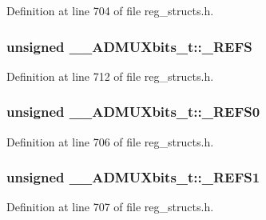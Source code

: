 Definition at line 704 of file reg\+\_\+structs.\+h.

\hypertarget{union_____a_d_m_u_xbits__t_a0b409640eeea6166e1a035446ede13e9}{
\subsubsection[{\+\_\+\+R\+E\+F\+S}]{\setlength{\rightskip}{0pt plus 5cm}unsigned \+\_\+\+\_\+\+A\+D\+M\+U\+Xbits\+\_\+t\+::\+\_\+\+R\+E\+F\+S}}\label{union_____a_d_m_u_xbits__t_a0b409640eeea6166e1a035446ede13e9}


Definition at line 712 of file reg\+\_\+structs.\+h.

\hypertarget{union_____a_d_m_u_xbits__t_acde77705271f7e98bde7bff3c2d28e8a}{
\subsubsection[{\+\_\+\+R\+E\+F\+S0}]{\setlength{\rightskip}{0pt plus 5cm}unsigned \+\_\+\+\_\+\+A\+D\+M\+U\+Xbits\+\_\+t\+::\+\_\+\+R\+E\+F\+S0}}\label{union_____a_d_m_u_xbits__t_acde77705271f7e98bde7bff3c2d28e8a}


Definition at line 706 of file reg\+\_\+structs.\+h.

\hypertarget{union_____a_d_m_u_xbits__t_af3ccbaeb688b8b7848b8b020b8506fc0}{
\subsubsection[{\+\_\+\+R\+E\+F\+S1}]{\setlength{\rightskip}{0pt plus 5cm}unsigned \+\_\+\+\_\+\+A\+D\+M\+U\+Xbits\+\_\+t\+::\+\_\+\+R\+E\+F\+S1}}\label{union_____a_d_m_u_xbits__t_af3ccbaeb688b8b7848b8b020b8506fc0}


Definition at line 707 of file reg\+\_\+structs.\+h.

